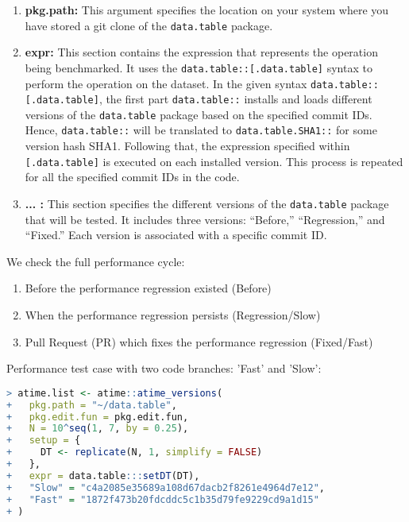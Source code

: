 \begin{enumerate}
    \item \textbf{pkg.path:} This argument specifies the location on your system where you have stored a git clone of the \texttt{data.table} package.
       
    \item \textbf{expr:} This section contains the expression that represents the operation being benchmarked. It uses the \texttt{data.table::[.data.table]} syntax to perform the operation on the dataset. In the given syntax \texttt{data.table::[.data.table]}, the first part \texttt{data.table::} installs and loads different versions of the \texttt{data.table} package based on the specified commit IDs. Hence, \texttt{data.table::} will be translated to \texttt{data.table.SHA1::} for some version hash SHA1. Following that, the expression specified within \texttt{[.data.table]} is executed on each installed version. This process is repeated for all the specified commit IDs in the code.
 
    \item \textbf{... :} This section specifies the different versions of the \texttt{data.table} package that will be tested. It includes three versions: ``Before,'' ``Regression,'' and ``Fixed.'' Each version is associated with a specific commit ID.
\end{enumerate}

We check the full performance cycle:

\begin{enumerate}
    \item Before the performance regression existed (Before)
    \item When the performance regression persists (Regression/Slow)
    \item Pull Request (PR) which fixes the performance regression (Fixed/Fast)
\end{enumerate}


\noindent Performance test case with two code branches: 'Fast' and 'Slow':\\

\begin{lstlisting}[language=R]
> atime.list <- atime::atime_versions(
+   pkg.path = "~/data.table",
+   pkg.edit.fun = pkg.edit.fun,
+   N = 10^seq(1, 7, by = 0.25),
+   setup = { 
+     DT <- replicate(N, 1, simplify = FALSE)
+   },
+   expr = data.table:::setDT(DT),
+   "Slow" = "c4a2085e35689a108d67dacb2f8261e4964d7e12",
+   "Fast" = "1872f473b20fdcddc5c1b35d79fe9229cd9a1d15"
+ )
\end{lstlisting}

